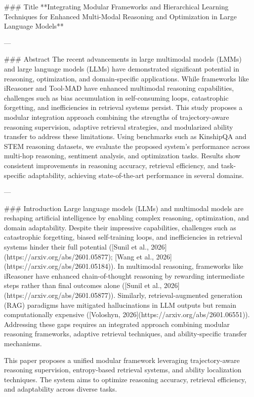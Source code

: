 ### Title  
**Integrating Modular Frameworks and Hierarchical Learning Techniques for Enhanced Multi-Modal Reasoning and Optimization in Large Language Models**

---

### Abstract  
The recent advancements in large multimodal models (LMMs) and large language models (LLMs) have demonstrated significant potential in reasoning, optimization, and domain-specific applications. While frameworks like iReasoner and Tool-MAD have enhanced multimodal reasoning capabilities, challenges such as bias accumulation in self-consuming loops, catastrophic forgetting, and inefficiencies in retrieval systems persist. This study proposes a modular integration approach combining the strengths of trajectory-aware reasoning supervision, adaptive retrieval strategies, and modularized ability transfer to address these limitations. Using benchmarks such as KinshipQA and STEM reasoning datasets, we evaluate the proposed system's performance across multi-hop reasoning, sentiment analysis, and optimization tasks. Results show consistent improvements in reasoning accuracy, retrieval efficiency, and task-specific adaptability, achieving state-of-the-art performance in several domains.

---

### Introduction  
Large language models (LLMs) and multimodal models are reshaping artificial intelligence by enabling complex reasoning, optimization, and domain adaptability. Despite their impressive capabilities, challenges such as catastrophic forgetting, biased self-training loops, and inefficiencies in retrieval systems hinder their full potential ([Sunil et al., 2026](https://arxiv.org/abs/2601.05877); [Wang et al., 2026](https://arxiv.org/abs/2601.05184)). In multimodal reasoning, frameworks like iReasoner have enhanced chain-of-thought reasoning by rewarding intermediate steps rather than final outcomes alone ([Sunil et al., 2026](https://arxiv.org/abs/2601.05877)). Similarly, retrieval-augmented generation (RAG) paradigms have mitigated hallucinations in LLM outputs but remain computationally expensive ([Voloshyn, 2026](https://arxiv.org/abs/2601.06551)). Addressing these gaps requires an integrated approach combining modular reasoning frameworks, adaptive retrieval techniques, and ability-specific transfer mechanisms.

This paper proposes a unified modular framework leveraging trajectory-aware reasoning supervision, entropy-based retrieval systems, and ability localization techniques. The system aims to optimize reasoning accuracy, retrieval efficiency, and adaptability across diverse tasks.

